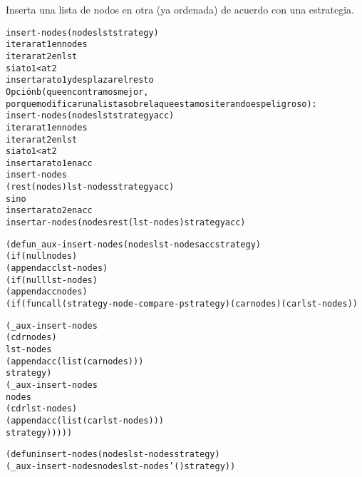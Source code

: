 \begin{aibox}{\comments}
Inserta una lista de nodos en otra (ya ordenada) de acuerdo con una estrategia.

\end{aibox}

\begin{aibox}{\pseudocode}
\begin{alltt}
   insert-nodes(nodes lst strategy)
       iterar at1 en nodes
           iterar at2 en lst
               si ato1 < at2
                   insertar ato1 y desplazar el resto
Opción b (que encontramos mejor,
porque modificar una lista sobre la que estamos iterando es peligroso):
   insert-nodes(nodes lst strategy acc)
       iterar at1 en nodes
           iterar at2 en lst
               si ato1 < at2
                   insertar ato1 en acc
                   insert-nodes 
                         (rest(nodes) lst-nodes strategy acc)
               sino
                   insertar ato2 en acc
                   insertar-nodes (nodes rest(lst-nodes) strategy acc)

\end{alltt}
\end{aibox}

\begin{aibox}{\code}
\begin{alltt}
(defun \_aux-insert-nodes (nodes lst-nodes acc strategy)
    (if (null nodes)
        (append acc lst-nodes)
        (if (null lst-nodes)
            (append acc nodes)
            (if  (funcall (strategy-node-compare-p strategy) (car nodes) (car lst-nodes))

                (\_aux-insert-nodes 
                    (cdr nodes)
                    lst-nodes
                    (append acc (list (car nodes)))
                    strategy)
                (\_aux-insert-nodes
                    nodes
                    (cdr lst-nodes)
                    (append acc (list (car lst-nodes)))
                    strategy)))))

(defun insert-nodes (nodes lst-nodes strategy)
    (\_aux-insert-nodes nodes lst-nodes '() strategy))




\end{alltt}
\end{aibox}
